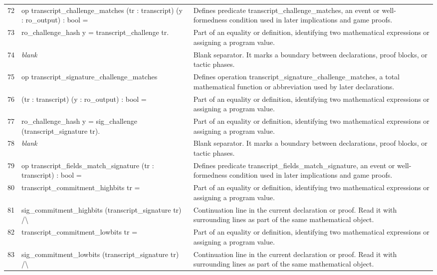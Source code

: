 \documentclass[10pt]{article}
\begin{document}
\begin{longtable}{r L{0.53\textwidth} L{0.37\textwidth}}
72 & {\ttfamily\scriptsize op transcript\_challenge\_matches (tr : transcript) (y : ro\_output) : bool =} & Defines predicate transcript\_challenge\_matches, an event or well-formedness condition used in later implications and game proofs. \\
73 & {\ttfamily\scriptsize   ro\_challenge\_hash y = transcript\_challenge tr.} & Part of an equality or definition, identifying two mathematical expressions or assigning a program value. \\
74 & {\ttfamily\scriptsize \emph{blank}} & Blank separator.  It marks a boundary between declarations, proof blocks, or tactic phases. \\
75 & {\ttfamily\scriptsize op transcript\_signature\_challenge\_matches} & Defines operation transcript\_signature\_challenge\_matches, a total mathematical function or abbreviation used by later declarations. \\
76 & {\ttfamily\scriptsize    (tr : transcript) (y : ro\_output) : bool =} & Part of an equality or definition, identifying two mathematical expressions or assigning a program value. \\
77 & {\ttfamily\scriptsize   ro\_challenge\_hash y = sig\_challenge (transcript\_signature tr).} & Part of an equality or definition, identifying two mathematical expressions or assigning a program value. \\
78 & {\ttfamily\scriptsize \emph{blank}} & Blank separator.  It marks a boundary between declarations, proof blocks, or tactic phases. \\
79 & {\ttfamily\scriptsize op transcript\_fields\_match\_signature (tr : transcript) : bool =} & Defines predicate transcript\_fields\_match\_signature, an event or well-formedness condition used in later implications and game proofs. \\
80 & {\ttfamily\scriptsize   transcript\_commitment\_highbits tr =} & Part of an equality or definition, identifying two mathematical expressions or assigning a program value. \\
81 & {\ttfamily\scriptsize     sig\_commitment\_highbits (transcript\_signature tr) /\textbackslash{}} & Continuation line in the current declaration or proof.  Read it with surrounding lines as part of the same mathematical object. \\
82 & {\ttfamily\scriptsize   transcript\_commitment\_lowbits tr =} & Part of an equality or definition, identifying two mathematical expressions or assigning a program value. \\
83 & {\ttfamily\scriptsize     sig\_commitment\_lowbits (transcript\_signature tr) /\textbackslash{}} & Continuation line in the current declaration or proof.  Read it with surrounding lines as part of the same mathematical object. \\

\end{longtable}
\end{document}
